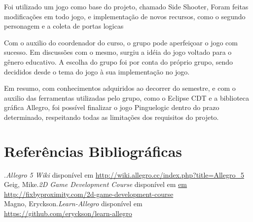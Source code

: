 \documentclass[fncyhd,a4paper]{article}
\begin{document}
	\large Foi utilizado um jogo como base do projeto, chamado Side Shooter, Foram feitas modificações em todo jogo, e implementação de novos recursos, como o segundo personagem e a coleta de portas
	logicas
	
	\large Com o auxilio do coordenador do curso, o grupo pode aperfeiçoar o jogo com sucesso. Em discussões com o mesmo, surgiu a idéia do jogo voltado para o gênero educativo. A escolha do grupo foi
	por conta do próprio grupo, sendo decididos desde o tema do jogo à sua implementação no jogo.
	
	\large Em resumo, com conhecimentos adquiridos ao decorrer do semestre, e com o auxilio das ferramentas utilizadas pelo grupo, como o Eclipse CDT e a biblioteca gráfica Allegro, foi possível finalizar
	o jogo Pinguelogic dentro do prazo determinado, respeitando todas as limitações dos requisitos do projeto.
	

	
	
	
	\section{\Large Referências Bibliográficas}

	\begin{thebibliography}{99}
	
		.\newblock \emph{Allegro 5 Wiki} 
		disponível em \url{http://wiki.allegro.cc/index.php?title=Allegro_5 } \\
	
		Geig, Mike.\newblock \emph{2D Game Development Course} 
		disponível em \url{em http://fixbyproximity.com/2d-game-development-course } \\

		Magno, Eryckson.\newblock \emph{Learn-Allegro} 
		disponível em \url{https://github.com/eryckson/learn-allegro  } \\
	
	\end{thebibliography}
	
	
\end{document}

